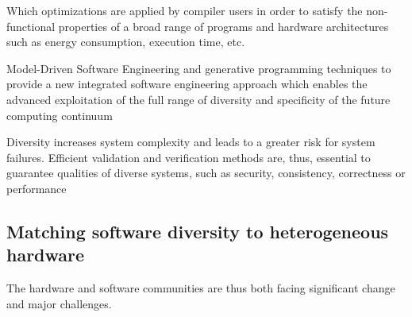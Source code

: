 Which optimizations are applied by compiler users in order to satisfy  the non-functional properties of a broad range of programs and hardware architectures such as energy consumption, execution time, etc. 




Model-Driven Software Engineering and generative programming techniques to provide a new integrated software engineering approach which enables the advanced exploitation of the full range of diversity and specificity of the future computing continuum

Diversity increases system complexity and leads to a greater risk for system failures. Efficient validation and verification methods are, thus, essential to guarantee qualities of diverse systems, such as security, consistency, correctness or performance

\subsection{Matching software diversity to heterogeneous hardware}

The hardware and software communities are thus both
facing significant change and major challenges.





